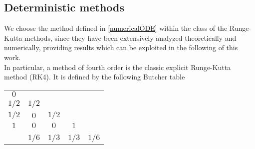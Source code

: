 \subsection{Deterministic methods}

We choose the method defined in \eqref{numericalODE} within the class of the Runge-Kutta methods, since they have been extensively analyzed theoretically and numerically, providing results which can be exploited in the following of this work. \\
In particular, a method of fourth order is the classic explicit Runge-Kutta method (RK4). It is defined by the following Butcher table
\begin{center}
	\begin{tabular}{c|cccc}
		$0$ & & & & \\
		$1/2$ & $1/2$ & & & \\
		$1/2$ & $0$ & $1/2$ & & \\
		$1$ & $0$ & $0$ & $1$ & \\ 
		\hline \\ [-1.5ex]
		 & $1/6$ & $1/3$ & $1/3$ & $1/6$ \\
	\end{tabular}
\end{center}
